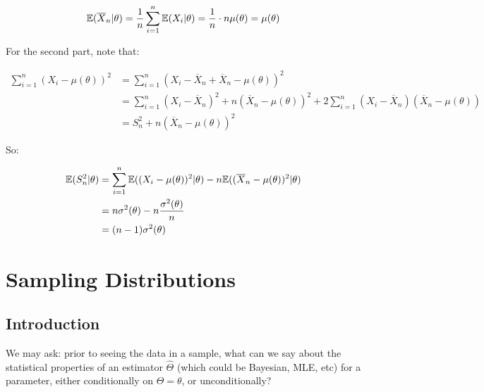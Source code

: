 \documentclass[a4paper]{article}
\begin{document}
                    \[
                        \mathbb{E}(\overline X_n | \theta) = \frac{1}{n} \sum_{i=1}^n
                        \mathbb{E}(X_i | \theta) = \frac{1}{n} \cdot n\mu(\theta) =
                        \mu(\theta)
                    \]

                    For the second part, note that:

                    \begin{align*}
                        \sum_{i=1}^n (X_i - \mu(\theta))^2 & = \sum_{i=1}^n (X_i
                            - \overline X_n + \overline X_n - \mu(\theta))^2 \\
                        & = \sum_{i=1}^n (X_i - \overline X_n)^2 + n (\overline
                            X_n - \mu(\theta))^2 + 2\sum_{i=1}^n (X_i -
                            \overline X_n)(\overline X_n - \mu(\theta)) \\
                        & = S_n^2 + n(\overline X_n - \mu(\theta))^2
                    \end{align*}

                    So:

                    \begin{align*}
                        \mathbb{E}(S_n^2 | \theta) & = \sum\limits_{i=1}^n \mathbb{E}((X_i -
                            \mu(\theta))^2 | \theta) - n \mathbb{E}((\overline X_n -
                            \mu(\theta))^2 | \theta) \\
                        & = n\sigma^2(\theta) - n\frac{\sigma^2(\theta)}{n} \\
                        & = (n - 1)\sigma^2(\theta)
                    \end{align*}

    \newpage
    \section{Sampling Distributions}
        \subsection{Introduction}
            \begin{fread}
                [DS12, section 8.1]
            \end{fread}

            We may ask: prior to seeing the data in a sample, what can we say
            about the statistical properties of an estimator $\widehat \Theta$
            (which could be Bayesian, MLE, etc) for a parameter, either
            conditionally on $\Theta = \theta$, or unconditionally?
\end{document}
